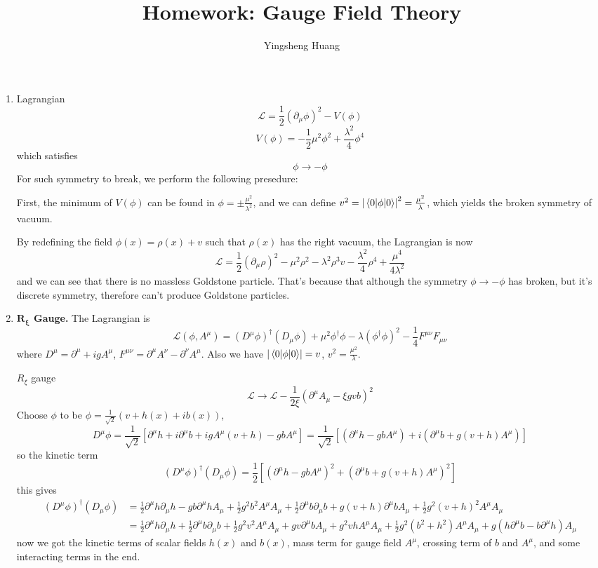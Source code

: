 \documentclass{article}
\title{Homework: Gauge Field Theory}
\author{Yingsheng Huang}
\newcommand{\la}{\lambda}
\newcommand{\lag}{\mathcal{L}}
\newcommand{\da}{^{\dagger}}
\newcommand{\sm}{^{\mu}}
\newcommand{\sn}{^{\nu}}
\newcommand{\smn}{^{\mu\nu}}
\newcommand{\dm}{\partial^{\mu}}
\newcommand{\Asquare}{A^{\mu}A_{\mu}}
\begin{document}
\maketitle
\begin{enumerate}[\bf 1.]
  \item Lagrangian
	$$\lag=\frac{1}{2}(\partial_{\mu}\phi)^2-V(\phi)$$
	$$V(\phi)=-\frac{1}{2}\mu^2\phi^2+\frac{\la^2}{4}\phi^4$$
	which satisfies
	$$\phi\rightarrow-\phi$$
	For such symmetry to break, we perform the following presedure:

	First, the minimum of $V(\phi)$ can be found in $\phi=\pm \frac{\mu^2}{\la^2}$, and we can define $v^2=\abs{\mel{0}{\phi}{0}}^2=\frac{\mu^2}{\la}$, which yields the broken symmetry of vacuum.

	By redefining the field $\phi(x)=\rho(x)+v$ such that $\rho(x)$ has the right vacuum, the Lagrangian is now
	$$\lag=\frac{1}{2}(\partial_{\mu}\rho)^2-\mu^2\rho^2-\la^2\rho^3v-\frac{\la^2}{4}\rho^4+\frac{\mu^4}{4\la^2}$$
	and we can see that there is no massless Goldstone particle. That's because that although the symmetry $\phi\rightarrow-\phi$ has broken, but it's discrete symmetry, therefore can't produce Goldstone particles.
  \item {\bf{$\mathbf{R_{\xi}}$ Gauge.}} The Lagrangian is
	$$\lag(\phi, A^{\mu})=(D^{\mu}\phi)^{\dagger}(D_{\mu}\phi)+\mu^2\phi^{\dagger}\phi-\la(\phi\da\phi)^2-\frac{1}{4}F^{\mu\nu}F_{\mu\nu} $$
	where $D^{\mu}=\partial^{\mu}+igA\sm$, $F\smn=\dm A\sn-\partial\sn A\sm$. Also we have $\abs{\mel{0}{\phi}{0}}=v$, $v^2=\frac{\mu^2}{\la}$.

	$R_{\xi}$ gauge
	$$\lag\rightarrow\lag-\frac{1}{2\xi}(\partial\sm A_{\mu}-\xi gvb)^2$$
	Choose $\phi$ to be $\phi=\frac{1}{\sqrt{2}}(v+h(x)+i b(x))$,
	$$D^{\mu}\phi=\frac{1}{\sqrt{2}}[\partial\sm h+i\partial\sm b+igA\sm (v+h)-gbA\sm]=\frac{1}{\sqrt{2}}[(\partial\sm h-gbA\sm)+i(\partial\sm b+g(v+h)A\sm)]   $$
	so the kinetic term
	$$(D\sm\phi)\da(D_{\mu}\phi)=\frac{1}{2}[(\partial\sm h-gbA\sm)^2+(\dm b+g(v+h)A\sm)^2]  $$
	this gives
	\begin{align*}
	  (D\sm\phi)\da(D_{\mu}\phi)&=\frac{1}{2}\partial\sm h\partial_{\mu}h-gb\partial\sm hA_{\mu}+\frac{1}{2}g^2b^2A^{\mu}A_{\mu}+\frac{1}{2}\partial^{\mu}b\partial_{\mu}b+g(v+h)\partial\sm bA_{\mu}+\frac{1}{2}g^2(v+h)^2A^{\mu}A_{\mu}  \\
	  &=\frac{1}{2}\partial\sm h\partial_{\mu}h+\frac{1}{2}\partial^{\mu}b\partial_{\mu}b+\frac{1}{2}g^2v^2\Asquare+gv\partial\sm bA_{\mu}+g^2vhA^{\mu}A_{\mu}+\frac{1}{2}g^2(b^2+h^2)\Asquare+g(h\partial\sm b-b\partial\sm h)A_{\mu}
	\end{align*}
	now we got the kinetic terms of scalar fields $h(x)$ and $b(x)$, mass term for gauge field $A^{\mu}$, crossing term of $b$ and $A^{\mu}$, and some interacting terms in the end.


\end{enumerate}
\end{document}
